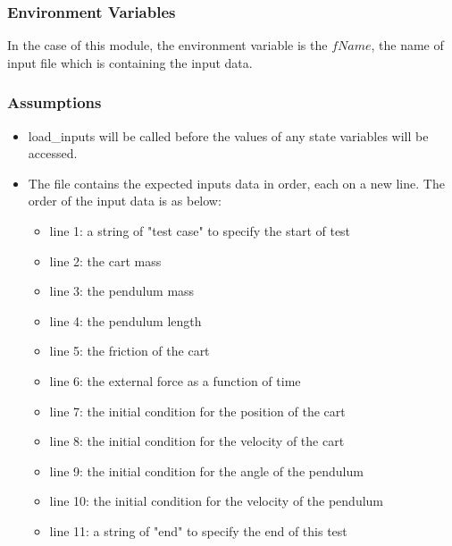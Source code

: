 \documentclass[12pt, titlepage]{article}
\begin{document}
\subsubsection{Environment Variables}

In the case of this module, the environment variable is the $fName$, the name of input file which is containing the input data.

\subsubsection{Assumptions}
\begin{itemize}

\item load\_inputs will be called before the values of any state variables will be accessed.

\item The file contains the expected inputs data in order, each on a new line. The order of the input data is as below:
\begin{itemize}
\item line 1: a string of "test case" to specify the start of test
\item line 2: the cart mass  
\item line 3: the pendulum mass   
\item line 4: the pendulum length
\item line 5: the friction of the cart
\item line 6: the external force as a function of time
\item line 7: the initial condition for the position of the cart
\item line 8: the initial condition for the velocity of the cart
\item line 9: the initial condition for the angle of the pendulum
\item line 10: the initial condition for the velocity of the pendulum
\item line 11: a string of "end" to specify the end of this test
\end{itemize}

\end{itemize}
\end{document}
